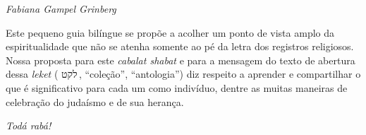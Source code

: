\begin{flushright}
\emph{Fabiana Gampel Grinberg}
\end{flushright}


Este pequeno guia bilíngue
 se propõe a acolher um ponto de vista amplo da espiritualidade que não se atenha somente ao pé da letra dos registros religiosos. Nossa proposta para este \emph{cabalat shabat} e  para a mensagem do texto de abertura dessa \emph{leket} ( {לקט}\,, ``coleção'', ``antologia'') diz respeito a aprender e compartilhar o que é significativo para cada um como indivíduo, dentre as muitas maneiras de celebração do judaísmo e de sua herança.%

\medskip
\emph{Todá rabá!}

